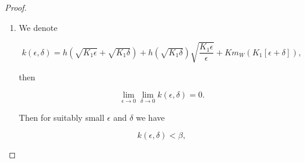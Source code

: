 \begin{proof}
\begin{enumerate}
        \begin{equation}\label{4-2-InProofSup:qandp1}-\underbrace{\frac{1}{\delta}(t'-s')}_{\overset{def}{=}q_{\delta}} + H(t',x',\underbrace{\frac{1}{\epsilon}(x'-y')}_{\overset{def}{=}p_{\epsilon}})\leq0.\end{equation}

        Analogously, defining 

        \[w(s,y) = -\frac{1}{2\delta}\abs{t'-s}^2 - \frac{1}{2\epsilon}\abs{x'-y}^2 + \beta(s-t_1),\]

        we get:

        \begin{equation}\label{4-2-InProofSup:qandp2}
            -\beta-q_{\delta}+H(s',y',p_{\epsilon})\geq0.
        \end{equation}

        Combining \ref{4-2-InProofSup:qandp1} and \ref{4-2-InProofSup:qandp2} we get

        \begin{align*}
            \beta & \leq H(s',y',p_{\epsilon}) - H(t',x',p_{\epsilon}) \\
            & \leq h(\abs{t'-s'} + \abs{x'-y'}) + h(\abs{t'-s'})\abs{p_{\epsilon}} + K\abs{x'-y'}\abs{p_{\epsilon}} \\
            & \leq h(\sqrt{K_1\epsilon} + \sqrt{K_1\delta}) + h(\sqrt{K_1\delta})\frac{1}{\epsilon}\sqrt{K_1\epsilon} + K\frac{\abs{x'-y'}^2}{\epsilon} \\
            & \leq h(\sqrt{K_1\epsilon} + \sqrt{K_1\delta}) + h(\sqrt{K_1\delta})\sqrt{\frac{K_1\epsilon}{\epsilon}} + Km_W(K_1[\epsilon+\delta]).
        \end{align*}
        
        \item We denote
        
        \begin{equation*}\label{4-2-inproofSup:k}
            k(\epsilon,\delta) = h(\sqrt{K_1\epsilon} + \sqrt{K_1\delta}) + h(\sqrt{K_1\delta})\sqrt{\frac{K_1\epsilon}{\epsilon}} + Km_W(K_1[\epsilon+\delta]),
        \end{equation*}

        then

        \[\lim_{\epsilon\to0}\lim_{\delta\to0} k(\epsilon,\delta) = 0.\]

        Then for suitably small $\epsilon$ and $\delta$ we have

        \[k(\epsilon,\delta) < \beta,\]


\end{enumerate}
\end{proof}
